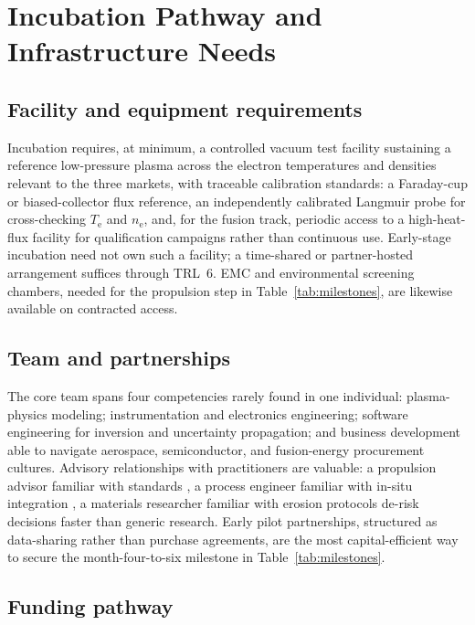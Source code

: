 \section{Incubation Pathway and Infrastructure Needs}
\label{sec:incubation}

\subsection{Facility and equipment requirements}

Incubation requires, at minimum, a controlled vacuum test facility sustaining a reference low-pressure plasma across the electron temperatures and densities relevant to the three markets, with traceable calibration standards: a Faraday-cup or biased-collector flux reference, an independently calibrated Langmuir probe for cross-checking $T_{\mathrm{e}}$ and $n_{\mathrm{e}}$, and, for the fusion track, periodic access to a high-heat-flux facility \cite{ref0586,ref0588} for qualification campaigns rather than continuous use. Early-stage incubation need not own such a facility; a time-shared or partner-hosted arrangement suffices through TRL~6. EMC and environmental screening chambers, needed for the propulsion step in Table~\ref{tab:milestones}, are likewise available on contracted access.

\subsection{Team and partnerships}

The core team spans four competencies rarely found in one individual: plasma-physics modeling; instrumentation and electronics engineering; software engineering for inversion and uncertainty propagation; and business development able to navigate aerospace, semiconductor, and fusion-energy procurement cultures. Advisory relationships with practitioners are valuable: a propulsion advisor familiar with standards \cite{ref0490}, a process engineer familiar with in-situ integration \cite{ref0556}, a materials researcher familiar with erosion protocols \cite{ref0593} de-risk decisions faster than generic research. Early pilot partnerships, structured as data-sharing rather than purchase agreements, are the most capital-efficient way to secure the month-four-to-six milestone in Table~\ref{tab:milestones}.

\subsection{Funding pathway}

